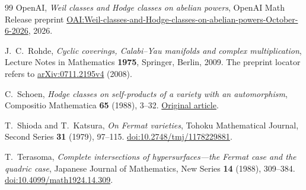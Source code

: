 \documentclass[11pt]{article}
\theoremstyle{plain}
\theoremstyle{definition}
\theoremstyle{remark}
\numberwithin{equation}{section}
\begin{document}
\begin{thebibliography}{99}
OpenAI,
\emph{Weil classes and Hodge classes on abelian powers},
OpenAI Math Release preprint
\href{https://github.com/openai/math/blob/main/preprints/Weil-classes-and-Hodge-classes-on-abelian-powers-October-6-2026/paper.pdf}{OAI:Weil-classes-and-Hodge-classes-on-abelian-powers-October-6-2026},
2026.

J.~C.~Rohde,
\emph{Cyclic coverings, Calabi--Yau manifolds and complex multiplication},
Lecture Notes in Mathematics \textbf{1975}, Springer, Berlin, 2009.
The preprint locator refers to
\href{https://arxiv.org/pdf/0711.2195v4}{arXiv:0711.2195v4} (2008).

C.~Schoen,
\emph{Hodge classes on self-products of a variety with an automorphism},
Compositio Mathematica \textbf{65} (1988), 3--32.
\href{https://www.numdam.org/article/CM_1988__65_1_3_0.pdf}{Original article}.

T.~Shioda and T.~Katsura,
\emph{On Fermat varieties},
Tohoku Mathematical Journal, Second Series \textbf{31} (1979),
97--115.
\href{https://doi.org/10.2748/tmj/1178229881}{doi:10.2748/tmj/1178229881}.

T.~Terasoma,
\emph{Complete intersections of hypersurfaces---the Fermat case
and the quadric case},
Japanese Journal of Mathematics, New Series \textbf{14} (1988),
309--384.
\href{https://doi.org/10.4099/math1924.14.309}{doi:10.4099/math1924.14.309}.

\end{thebibliography}
\end{document}

